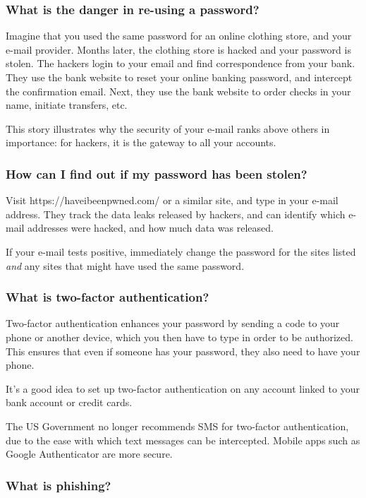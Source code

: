 \subsubsection{What is the danger in re-using a password?}

Imagine that you used the same password for an online clothing store, and your e-mail provider. Months later, the clothing store is hacked and your password is stolen. The hackers login to your email and find correspondence from your bank. They use the bank website to reset your online banking password, and intercept the confirmation email. Next, they use the bank website to order checks in your name, initiate transfers, etc.

This story illustrates why the security of your e-mail ranks above others in importance: for hackers, it is the gateway to all your accounts.

\subsubsection{How can I find out if my password has been stolen?}

Visit https://haveibeenpwned.com/ or a similar site, and type in your e-mail address. They track the data leaks released by hackers, and can identify which e-mail addresses were hacked, and how much data was released.

If your e-mail tests positive, immediately change the password for the sites listed \textit{and} any sites that might have used the same password. 

\subsubsection{What is two-factor authentication?}

Two-factor authentication enhances your password by sending a code to your phone or another device, which you then have to type in order to be authorized. This ensures that even if someone has your password, they also need to have your phone.

It's a good idea to set up two-factor authentication on any account linked to your bank account or credit cards.

The US Government no longer recommends SMS for two-factor authentication, due to the ease with which text messages can be intercepted. Mobile apps such as Google Authenticator are more secure.

\subsubsection{What is phishing?}

